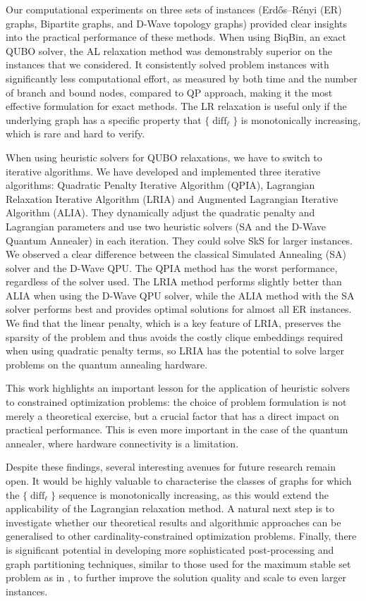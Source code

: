 \documentclass{article}
\DeclareMathOperator{\diff}{diff}
\begin{document}
Our computational experiments on three sets of instances (Erd\H{o}s--R\'enyi (ER) graphs, Bipartite graphs, and D-Wave topology graphs) provided clear insights into the practical performance of these methods.
When using BiqBin, an exact QUBO solver, the AL relaxation method was demonstrably superior on the instances that we considered. It consistently solved problem instances with significantly less computational effort, as measured by both time and the number of branch and bound nodes, compared to QP approach, making it the most effective formulation for exact methods.
The LR relaxation is useful only if the underlying graph has a specific property that $\{\diff_{\ell}\}$ is monotonically increasing, which is rare and hard to verify.



When using heuristic solvers for QUBO relaxations, we have to switch to iterative algorithms. We have developed and implemented three iterative algorithms: Quadratic Penalty Iterative Algorithm (QPIA), Lagrangian Relaxation Iterative Algorithm (LRIA) and Augmented Lagrangian Iterative Algorithm (ALIA). They dynamically adjust the quadratic penalty and Lagrangian parameters and use two heuristic solvers (SA and the D-Wave Quantum Annealer) in each iteration. They could solve SkS for larger instances.
We observed a clear difference between the classical Simulated Annealing (SA) solver and the D-Wave QPU.
The QPIA method has the worst performance, regardless of the solver used.
The LRIA method performs slightly better than ALIA when using the D-Wave QPU solver, while the ALIA method with the SA solver performs best and provides optimal solutions for almost all ER instances.
We find that the linear penalty, which is a key feature of LRIA, preserves the sparsity of the problem and thus avoids the costly clique embeddings required when using quadratic penalty terms, so LRIA has the potential to solve larger problems on the quantum annealing hardware.


This work highlights an important lesson for the application of heuristic solvers to constrained optimization problems: the choice of problem formulation is not merely a theoretical exercise, but a crucial factor that has a direct impact on practical performance. This is even more important in the case of the quantum annealer, where hardware connectivity is a limitation.

Despite these findings, several interesting avenues for future research remain open. It would be highly valuable to characterise the classes of graphs for which the $\{\diff_{\ell}\}$ sequence is monotonically increasing, as this would extend the applicability of the Lagrangian relaxation method. A natural next step is to investigate whether our theoretical results and algorithmic approaches can be generalised to other cardinality-constrained optimization problems. Finally, there is significant potential in developing more sophisticated post-processing and graph partitioning techniques, similar to those used for the maximum stable set problem as in \cite{Krpan2024}, to further improve the solution quality and scale to even larger instances.
\end{document}
